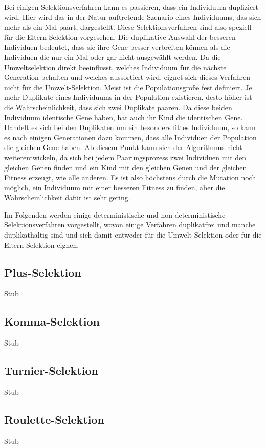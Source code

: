 Bei einigen Selektionsverfahren kann es passieren, dass ein Individuum dupliziert wird. Hier wird das in der Natur auftretende Szenario eines Individuums, das sich mehr als ein Mal paart, dargestellt. Diese Selektionsverfahren sind also speziell für die Eltern-Selektion vorgesehen. Die duplikative Auswahl der besseren Individuen bedeutet, dass sie ihre Gene besser verbreiten können als die Individuen die nur ein Mal oder gar nicht ausgewählt werden. Da die Umweltselektion direkt beeinflusst, welches Individuum für die nächste Generation behalten und welches aussortiert wird, eignet sich dieses Verfahren nicht für die Umwelt-Selektion. Meist ist die Populationsgröße fest definiert. Je mehr Duplikate eines Individuums in der Population existieren, desto höher ist die Wahrscheinlichkeit, dass sich zwei Duplikate paaren. Da diese beiden Individuum identische Gene haben, hat auch ihr Kind die identischen Gene. Handelt es sich bei den Duplikaten um ein besonders fittes Individuum, so kann es nach einigen Generationen dazu kommen, dass alle Individuen der Population die gleichen Gene haben. Ab diesem Punkt kann sich der Algorithmus nicht weiterentwickeln, da sich bei jedem Paarungsprozess zwei Individuen mit den gleichen Genen finden und ein Kind mit den gleichen Genen und der gleichen Fitness erzeugt, wie alle anderen. Es ist also höchstens durch die Mutation noch möglich, ein Individuum mit einer besseren Fitness zu finden, aber die Wahrscheinlichkeit dafür ist sehr gering. 

Im Folgenden werden einige deterministische und non-deterministische Selektionsverfahren vorgestellt, wovon einige Verfahren duplikatfrei und manche duplikathaltig sind und sich damit entweder für die Umwelt-Selektion oder für die Eltern-Selektion eignen. 

\subsection{Plus-Selektion}
Stub

\subsection{Komma-Selektion}
Stub

\subsection{Turnier-Selektion}
Stub

\subsection{Roulette-Selektion}
Stub

